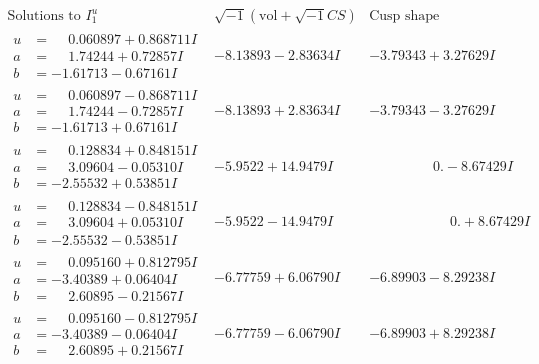 \documentclass[1p]{elsarticle_modified}
\theoremstyle{definition}
\newcommand{\I}{\sqrt{-1}}
\begin{document}
$$\begin{array}{c|c|c}  
\text{Solutions to }I^u_{1}& \I (\text{vol} + \sqrt{-1}CS) & \text{Cusp shape}\\
 \hline 
\begin{aligned}
u &= \phantom{-}0.060897 + 0.868711 I \\
a &= \phantom{-}1.74244 + 0.72857 I \\
b &= -1.61713 - 0.67161 I\end{aligned}
 & -8.13893 - 2.83634 I & -3.79343 + 3.27629 I \\ \hline\begin{aligned}
u &= \phantom{-}0.060897 - 0.868711 I \\
a &= \phantom{-}1.74244 - 0.72857 I \\
b &= -1.61713 + 0.67161 I\end{aligned}
 & -8.13893 + 2.83634 I & -3.79343 - 3.27629 I \\ \hline\begin{aligned}
u &= \phantom{-}0.128834 + 0.848151 I \\
a &= \phantom{-}3.09604 - 0.05310 I \\
b &= -2.55532 + 0.53851 I\end{aligned}
 & -5.9522 + 14.9479 I & \phantom{-0.000000 } 0. - 8.67429 I \\ \hline\begin{aligned}
u &= \phantom{-}0.128834 - 0.848151 I \\
a &= \phantom{-}3.09604 + 0.05310 I \\
b &= -2.55532 - 0.53851 I\end{aligned}
 & -5.9522 - 14.9479 I & \phantom{-0.000000 -}0. + 8.67429 I \\ \hline\begin{aligned}
u &= \phantom{-}0.095160 + 0.812795 I \\
a &= -3.40389 + 0.06404 I \\
b &= \phantom{-}2.60895 - 0.21567 I\end{aligned}
 & -6.77759 + 6.06790 I & -6.89903 - 8.29238 I \\ \hline\begin{aligned}
u &= \phantom{-}0.095160 - 0.812795 I \\
a &= -3.40389 - 0.06404 I \\
b &= \phantom{-}2.60895 + 0.21567 I\end{aligned}
 & -6.77759 - 6.06790 I & -6.89903 + 8.29238 I \\ \hline\begin{aligned}

\end{aligned}
\end{array}$$
\end{document}
